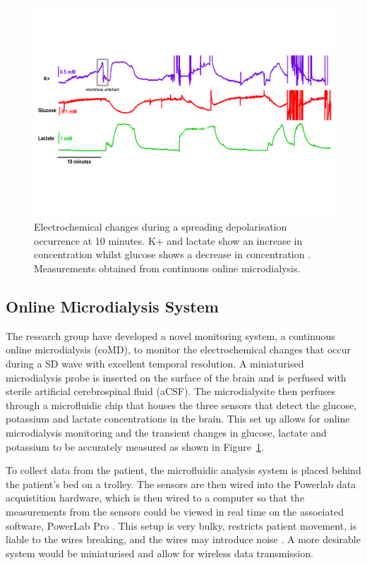 \begin{figure}[t!]
\centering
\includegraphics[trim={0cm 5cm 0.5cm  5cm}, clip, width=1\textwidth]{./figures/conc.pdf}
\captionsetup{justification=centering}
\caption{Electrochemical changes during a spreading depolarisation occurrence at 10 minutes. K+ and lactate show an increase in concentration whilst glucose shows a decrease in concentration \cite{Rogers2017}. Measurements obtained from continuous online microdialysis.}
\label{fig: SD}
\end{figure}

\subsection{Online Microdialysis System}
The research group have developed a novel monitoring system, a continuous online microdialysis (coMD), to monitor the electrochemical changes that occur during a SD wave with excellent temporal resolution. A miniaturised microdialysis probe is inserted on the surface of the brain and is perfused with sterile artificial cerebrospinal fluid (aCSF). The microdialysite then perfuses through a microfluidic chip that houses the three sensors that detect the glucose, potassium and lactate concentrations in the brain. This set up allows for online microdialysis monitoring and the transient changes in glucose, lactate and potassium to be accurately measured \cite{Rogers2017} as shown in Figure~\ref{fig: SD}.

To collect data from the patient, the microfluidic analysis system is placed behind the patient's bed on a trolley. The sensors are then wired into the Powerlab data acquistition hardware, which is then wired to a computer so that the measurements from the sensors could be viewed in real time on the associated software, PowerLab Pro \cite{Rogers2017}. This setup is very bulky, restricts patient movement, is liable to the wires breaking, and the wires may introduce noise \cite{Ferguson2011}. A more desirable system would be miniaturised and allow for wireless data transmission.



